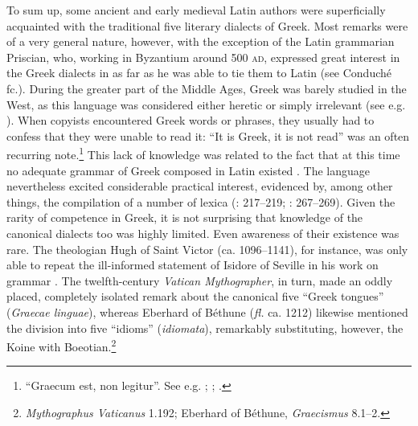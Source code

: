 {To sum up, some ancient and early medieval Latin authors were superficially acquainted with the traditional five literary dialects of Greek. Most remarks were of a very general nature, however, with the exception of the Latin grammarian Priscian, who, working in Byzantium around 500 \textsc{ad}, expressed great interest in the Greek dialects in as far as he was able to tie them to Latin (see Conduché fc.). During the greater part of the Middle Ages, Greek was barely studied in the West, as this language was considered either heretic or simply irrelevant (see e.g. \citealt{Boulhol2014}). When copyists encountered Greek words or phrases, they usually had to confess that they were unable to read it: “It is Greek, it is not read” was an often recurring note.\footnote{ “Graecum est, non legitur”. See e.g. \citet[\textsc{i.}246–275]{Bischoff1961, Bischoff1981}; {\citet[esp. 3ff]{Weiss1977}; \citet[36]{Saladin2000}.}} This lack of knowledge was related to the fact that at this time no adequate grammar of Greek composed in Latin existed \citep[215]{Bischoff1961}. The language nevertheless excited considerable practical interest, evidenced by, among other things, the compilation of a number of lexica (\citealt{Bischoff1961}: 217–219; \citealt{Dahan1995}: 267–269). Given the rarity of competence in Greek, it is not surprising that knowledge of the canonical dialects too was highly limited. Even awareness of their existence was rare. The theologian Hugh of Saint Victor (ca. 1096–1141), for instance, was only able to repeat the ill-informed statement of Isidore of Seville in his work on grammar \citep[79]{Hugh1966}. The twelfth-century \textit{Vatican Mythographer}, in turn, made an oddly placed, completely isolated remark about the canonical five “Greek tongues” (\textit{Graecae linguae}), whereas Eberhard of Béthune (\textit{fl.} ca. 1212) likewise mentioned the division into five “idioms” (\textit{idiomata}), remarkably substituting, however, the Koine with Boeotian.\footnote{\textit{Mythographus Vaticanus} 1.192; Eberhard of Béthune, \textit{Graecismus} 8.1–2.}

}
